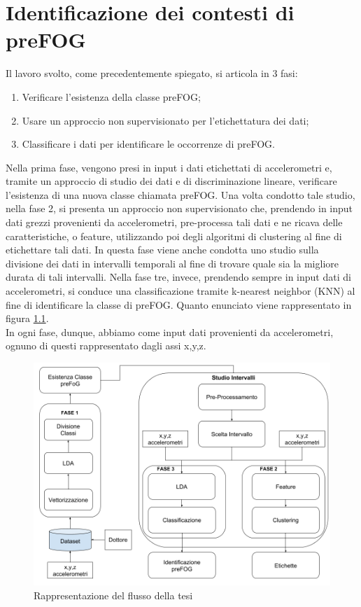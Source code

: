

\chapter[Identificazione dei contesti di preFOG]{Identificazione dei contesti di preFOG}\label{chap5:Automatic}
Il lavoro svolto, come precedentemente spiegato, si articola in 3 fasi:
\begin{enumerate}
	\item Verificare l'esistenza della classe preFOG;
	\item Usare un approccio non supervisionato per l'etichettatura dei dati;
	\item Classificare i dati per identificare le occorrenze di preFOG.
\end{enumerate}
Nella prima fase, vengono presi in input i dati etichettati di accelerometri e, tramite un approccio di studio dei dati e di discriminazione lineare, verificare l'esistenza di una nuova classe chiamata preFOG. Una volta condotto tale studio, nella fase 2, si presenta un approccio non supervisionato che, prendendo in input dati grezzi provenienti da accelerometri, pre-processa tali dati e ne ricava delle caratteristiche, o feature, utilizzando poi degli algoritmi di clustering al fine di etichettare tali dati. In questa fase viene anche condotta uno studio sulla divisione dei dati in intervalli temporali al fine di trovare quale sia la migliore durata di tali intervalli. Nella fase tre, invece, prendendo sempre in input dati di accelerometri, si conduce una classificazione tramite k-nearest neighbor (KNN) al fine di identificare la classe di preFOG. Quanto enunciato viene rappresentato in figura \ref{FlussoTesi}.\\
In ogni fase, dunque, abbiamo come input dati provenienti da accelerometri, ognuno di questi rappresentato dagli assi x,y,z.\\
\begin{figure}[]
	\centering
	\includegraphics[scale=0.35]{images/FlussoTesi.png}
	\caption{Rappresentazione del flusso della tesi}
	\label{FlussoTesi}
\end{figure}
